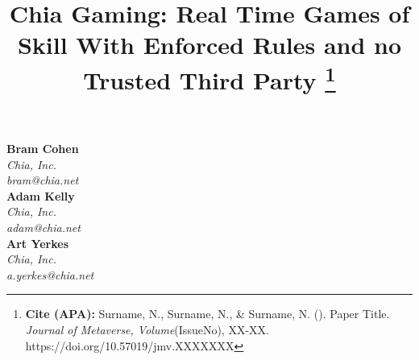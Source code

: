 \documentclass[a4paper]{article}
\title{
    \textbf{Chia Gaming: Real Time Games of Skill With Enforced Rules and no Trusted Third Party} 
    \thanks{
        \sloppy
        \textbf{Cite (APA):} Surname, N., Surname, N., \& Surname, N. (\the\year). Paper Title. \textit{Journal of Metaverse, Volume}(IssueNo), XX-XX. https://doi.org/10.57019/jmv.XXXXXXX
    }
}
\date{} %
\renewcommand*{\arraystretch}{1.1}
\begin{document}
\newcommand*{\mline}[1]{%
\begingroup
    \renewcommand*{\arraystretch}{1.1}%
   \begin{tabular}[c]{@{}>{\raggedright\arraybackslash}p{2cm}@{}}#1\end{tabular}%
  \endgroup
}


\maketitle
\vspace{-1.5cm}
\thispagestyle{firstpage}

\begin{multicols}{3}
	\centering
	\textbf{Bram Cohen}\\
	\textit{Chia, Inc.}\\
	\textit{bram@chia.net}\\
	\vfill
        \textbf{Adam Kelly}\\
	\textit{Chia, Inc.}\\
	\textit{adam@chia.net}\\
	\vfill
        \textbf{Art Yerkes}\\
	\textit{Chia, Inc.}\\
	\textit{a.yerkes@chia.net}\\
	\vfill
\end{multicols}

\singlespacing
\setlength{\parskip}{6pt}
\setlength{\parindent}{0.5cm}
\end{document}
